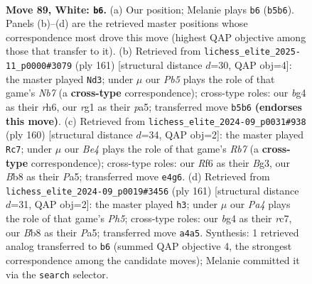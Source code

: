 \documentclass[11pt]{article}
\begin{document}
\clearpage

\begin{figure}[p]\centering
\begin{subfigure}{0.46\textwidth}\centering
\resizebox{\linewidth}{!}{%
\newchessgame
\chessboard[
  setfen={1B4k1/8/5R2/1P1N4/P3B1b1/3K3p/8/6r1 w - - 17 89},
  showmover=false,
  pgfstyle=straightmove, color=movearrow, markmove={b5-b6}
]}
\caption{}
\end{subfigure}\hfill
\begin{subfigure}{0.46\textwidth}\centering
\resizebox{\linewidth}{!}{%
\newchessgame
\chessboard[
  setfen={8/8/p1k1K2R/Pbp5/8/8/1n6/4B3 b - - 40 81},
  showmover=false,
  pgfstyle=straightmove, color=movearrow, markmove={b2-d3}
]}
\caption{}
\end{subfigure}
\\[4pt]
\begin{subfigure}{0.46\textwidth}\centering
\resizebox{\linewidth}{!}{%
\newchessgame
\chessboard[
  setfen={8/1R6/p5Pb/P7/4k1K1/6B1/2r5/8 w - - 15 81},
  showmover=false,
  pgfstyle=straightmove, color=movearrow, markmove={b7-c7}
]}
\caption{}
\end{subfigure}\hfill
\begin{subfigure}{0.46\textwidth}\centering
\resizebox{\linewidth}{!}{%
\newchessgame
\chessboard[
  setfen={5k2/2R5/8/p4K2/P4P1p/6r1/8/4bB2 b - - 7 81},
  showmover=false,
  pgfstyle=straightmove, color=movearrow, markmove={h4-h3}
]}
\caption{}
\end{subfigure}
\caption{\textbf{Move 89, White: \texttt{b6}.} (a) Our position; Melanie plays \texttt{b6} (\texttt{b5b6}). Panels (b)--(d) are the retrieved master positions whose correspondence most drove this move (highest QAP objective among those that transfer to it). (b) Retrieved from \texttt{lichess\_elite\_2025-11\_p0000\#3079} (ply 161) [structural distance $d$=30, QAP obj=4]: the master played \texttt{Nd3}; under $\mu$ our \emph{Pb5} plays the role of that game's \emph{Nb7} (a \textbf{cross-type} correspondence); cross-type roles: our \emph{b}g4 as their \emph{r}h6, our \emph{r}g1 as their \emph{p}a5; transferred move \texttt{b5b6} \textbf{(endorses this move)}. (c) Retrieved from \texttt{lichess\_elite\_2024-09\_p0031\#938} (ply 160) [structural distance $d$=34, QAP obj=2]: the master played \texttt{Rc7}; under $\mu$ our \emph{Be4} plays the role of that game's \emph{Rb7} (a \textbf{cross-type} correspondence); cross-type roles: our \emph{R}f6 as their \emph{B}g3, our \emph{B}b8 as their \emph{P}a5; transferred move \texttt{e4g6}. (d) Retrieved from \texttt{lichess\_elite\_2024-09\_p0019\#3456} (ply 161) [structural distance $d$=31, QAP obj=2]: the master played \texttt{h3}; under $\mu$ our \emph{Pa4} plays the role of that game's \emph{Ph5}; cross-type roles: our \emph{b}g4 as their \emph{r}c7, our \emph{B}b8 as their \emph{P}a5; transferred move \texttt{a4a5}. Synthesis: 1 retrieved analog transferred to \texttt{b6} (summed QAP objective 4, the strongest correspondence among the candidate moves); Melanie committed it via the \texttt{search} selector.}
\label{fig:thought-m176}
\end{figure}
\end{document}
